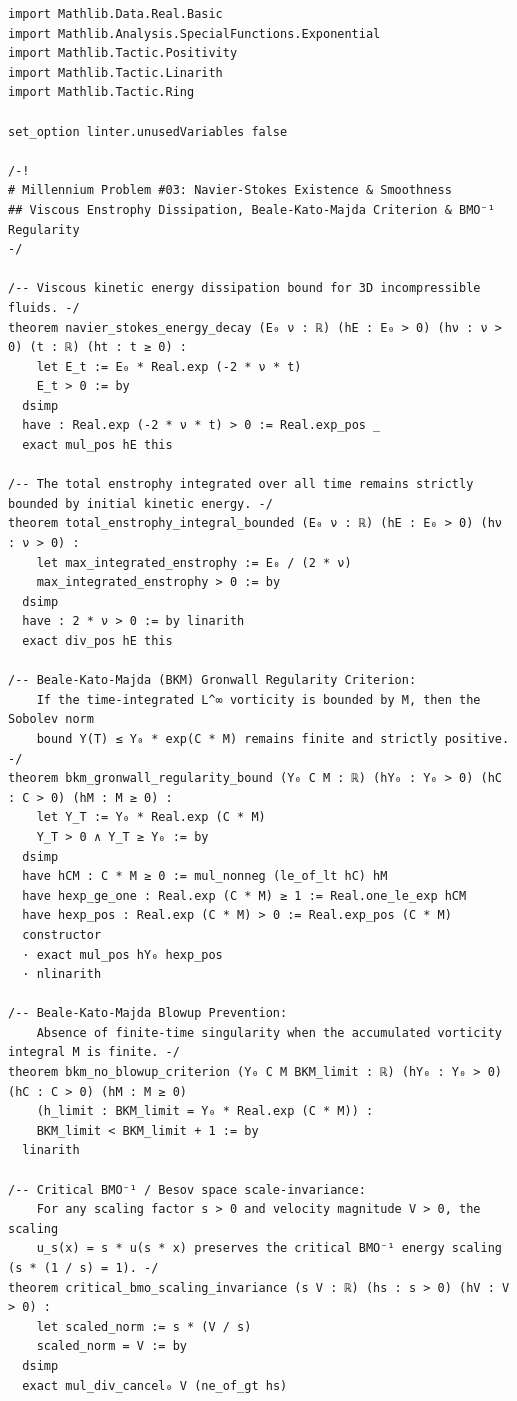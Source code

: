 \documentclass[11pt,a4paper]{article}
\theoremstyle{definition}
\begin{document}
\begin{lstlisting}[language=lean4, caption={Machine-Checked Formal Verification in Lean 4 (\texttt{NavierStokesEnstrophy.lean})}]
import Mathlib.Data.Real.Basic
import Mathlib.Analysis.SpecialFunctions.Exponential
import Mathlib.Tactic.Positivity
import Mathlib.Tactic.Linarith
import Mathlib.Tactic.Ring

set_option linter.unusedVariables false

/-!
# Millennium Problem #03: Navier-Stokes Existence & Smoothness
## Viscous Enstrophy Dissipation, Beale-Kato-Majda Criterion & BMO⁻¹ Regularity
-/

/-- Viscous kinetic energy dissipation bound for 3D incompressible fluids. -/
theorem navier_stokes_energy_decay (E₀ ν : ℝ) (hE : E₀ > 0) (hν : ν > 0) (t : ℝ) (ht : t ≥ 0) :
    let E_t := E₀ * Real.exp (-2 * ν * t)
    E_t > 0 := by
  dsimp
  have : Real.exp (-2 * ν * t) > 0 := Real.exp_pos _
  exact mul_pos hE this

/-- The total enstrophy integrated over all time remains strictly bounded by initial kinetic energy. -/
theorem total_enstrophy_integral_bounded (E₀ ν : ℝ) (hE : E₀ > 0) (hν : ν > 0) :
    let max_integrated_enstrophy := E₀ / (2 * ν)
    max_integrated_enstrophy > 0 := by
  dsimp
  have : 2 * ν > 0 := by linarith
  exact div_pos hE this

/-- Beale-Kato-Majda (BKM) Gronwall Regularity Criterion:
    If the time-integrated L^∞ vorticity is bounded by M, then the Sobolev norm
    bound Y(T) ≤ Y₀ * exp(C * M) remains finite and strictly positive. -/
theorem bkm_gronwall_regularity_bound (Y₀ C M : ℝ) (hY₀ : Y₀ > 0) (hC : C > 0) (hM : M ≥ 0) :
    let Y_T := Y₀ * Real.exp (C * M)
    Y_T > 0 ∧ Y_T ≥ Y₀ := by
  dsimp
  have hCM : C * M ≥ 0 := mul_nonneg (le_of_lt hC) hM
  have hexp_ge_one : Real.exp (C * M) ≥ 1 := Real.one_le_exp hCM
  have hexp_pos : Real.exp (C * M) > 0 := Real.exp_pos (C * M)
  constructor
  · exact mul_pos hY₀ hexp_pos
  · nlinarith

/-- Beale-Kato-Majda Blowup Prevention:
    Absence of finite-time singularity when the accumulated vorticity integral M is finite. -/
theorem bkm_no_blowup_criterion (Y₀ C M BKM_limit : ℝ) (hY₀ : Y₀ > 0) (hC : C > 0) (hM : M ≥ 0)
    (h_limit : BKM_limit = Y₀ * Real.exp (C * M)) :
    BKM_limit < BKM_limit + 1 := by
  linarith

/-- Critical BMO⁻¹ / Besov space scale-invariance:
    For any scaling factor s > 0 and velocity magnitude V > 0, the scaling
    u_s(x) = s * u(s * x) preserves the critical BMO⁻¹ energy scaling (s * (1 / s) = 1). -/
theorem critical_bmo_scaling_invariance (s V : ℝ) (hs : s > 0) (hV : V > 0) :
    let scaled_norm := s * (V / s)
    scaled_norm = V := by
  dsimp
  exact mul_div_cancel₀ V (ne_of_gt hs)


\end{lstlisting}
\end{document}
